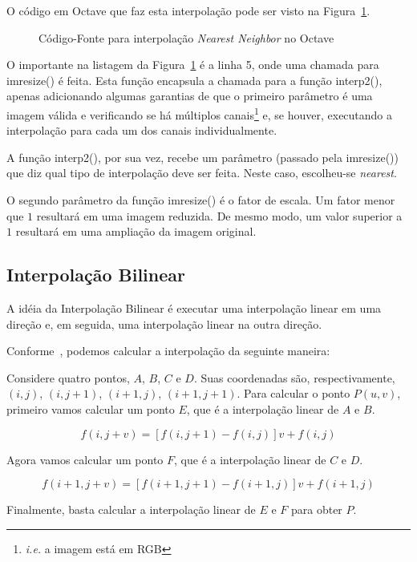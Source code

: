 \documentclass[12pt]{article}
\begin{document}
O código em Octave que faz esta interpolação pode ser visto na Figura~\ref{lst:scale:nearest}.

\begin{figure}[H]

\caption{Código-Fonte para interpolação \textit{Nearest Neighbor} no Octave}
\label{lst:scale:nearest}
\end{figure}

O importante na listagem da Figura~\ref{lst:scale:nearest} é a linha 5, onde uma chamada para \textsf{imresize()} é feita. Esta função encapsula a chamada para a função \textsf{interp2()}, apenas adicionando algumas garantias de que o primeiro parâmetro é uma imagem válida e verificando se há múltiplos canais\footnote{\textit{i.e.} a imagem está em RGB} e, se houver, executando a interpolação para cada um dos canais individualmente.

A função \textsf{interp2()}, por sua vez, recebe um parâmetro (passado pela \textsf{imresize()}) que diz qual tipo de interpolação deve ser feita. Neste caso, escolheu-se \emph{nearest}.

O segundo parâmetro da função \textsf{imresize()} é o fator de escala. Um fator menor que $1$ resultará em uma imagem reduzida. De mesmo modo, um valor superior a $1$ resultará em uma ampliação da imagem original.

\subsection{Interpolação Bilinear}\label{sec:redimensionamento:bilinear}

A idéia da Interpolação Bilinear é executar uma interpolação linear em uma direção e, em seguida, uma interpolação linear na outra direção.

Conforme~\cite{han2013}, podemos calcular a interpolação da seguinte maneira:

Considere quatro pontos, $A$, $B$, $C$ e $D$. Suas coordenadas são, respectivamente, $(i, j)$, $(i, j+1)$, $(i+1, j)$, $(i+1, j+1)$. Para calcular o ponto $P(u, v)$, primeiro vamos calcular um ponto $E$, que é a interpolação linear de $A$ e $B$.

\[
f(i, j+v) = [f(i, j+1) - f(i,j)]v + f(i, j)
\]

Agora vamos calcular um ponto $F$, que é a interpolação linear de $C$ e $D$.

\[
f(i + 1, j + v) = [f(i + 1, j + 1) - f(i + 1, j)]v + f(i + 1, j)
\]

Finalmente, basta calcular a interpolação linear de $E$ e $F$ para obter $P$.
\end{document}
